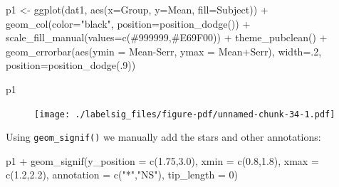 \documentclass[
  letterpaper,
  DIV=11,
  numbers=noendperiod]{scrreprt}
\newenvironment{Shaded}{\begin{snugshade}}{\end{snugshade}}
\newcommand{\AttributeTok}[1]{\textcolor[rgb]{0.40,0.45,0.13}{#1}}
\newcommand{\DecValTok}[1]{\textcolor[rgb]{0.68,0.00,0.00}{#1}}
\newcommand{\FloatTok}[1]{\textcolor[rgb]{0.68,0.00,0.00}{#1}}
\newcommand{\FunctionTok}[1]{\textcolor[rgb]{0.28,0.35,0.67}{#1}}
\newcommand{\NormalTok}[1]{\textcolor[rgb]{0.00,0.23,0.31}{#1}}
\newcommand{\OtherTok}[1]{\textcolor[rgb]{0.00,0.23,0.31}{#1}}
\newcommand{\SpecialCharTok}[1]{\textcolor[rgb]{0.37,0.37,0.37}{#1}}
\newcommand{\StringTok}[1]{\textcolor[rgb]{0.13,0.47,0.30}{#1}}
\begin{document}
\begin{Shaded}
\begin{Highlighting}[]
\NormalTok{p1 }\OtherTok{\textless{}{-}} \FunctionTok{ggplot}\NormalTok{(dat1, }\FunctionTok{aes}\NormalTok{(}\AttributeTok{x=}\NormalTok{Group, }\AttributeTok{y=}\NormalTok{Mean, }\AttributeTok{fill=}\NormalTok{Subject)) }\SpecialCharTok{+} 
  \FunctionTok{geom\_col}\NormalTok{(}\AttributeTok{color=}\StringTok{"black"}\NormalTok{, }\AttributeTok{position=}\FunctionTok{position\_dodge}\NormalTok{()) }\SpecialCharTok{+}
  \FunctionTok{scale\_fill\_manual}\NormalTok{(}\AttributeTok{values=}\FunctionTok{c}\NormalTok{(}\StringTok{\textquotesingle{}\#999999\textquotesingle{}}\NormalTok{,}\StringTok{\textquotesingle{}\#E69F00\textquotesingle{}}\NormalTok{)) }\SpecialCharTok{+}
  \FunctionTok{theme\_pubclean}\NormalTok{() }\SpecialCharTok{+}
  \FunctionTok{geom\_errorbar}\NormalTok{(}\FunctionTok{aes}\NormalTok{(}\AttributeTok{ymin =}\NormalTok{ Mean}\SpecialCharTok{{-}}\NormalTok{Serr, }
                    \AttributeTok{ymax =}\NormalTok{ Mean}\SpecialCharTok{+}\NormalTok{Serr), }
                  \AttributeTok{width=}\NormalTok{.}\DecValTok{2}\NormalTok{,}
                  \AttributeTok{position=}\FunctionTok{position\_dodge}\NormalTok{(.}\DecValTok{9}\NormalTok{)) }

\NormalTok{p1}
\end{Highlighting}
\end{Shaded}

\begin{figure}[H]

{\centering \texttt{[image: ./labelsig\_files/figure-pdf/unnamed-chunk-34-1.pdf]}

}

\end{figure}

Using \texttt{geom\_signif()} we manually add the stars and other
annotations:

\begin{Shaded}
\begin{Highlighting}[]
\NormalTok{p1 }\SpecialCharTok{+} 
  \FunctionTok{geom\_signif}\NormalTok{(}\AttributeTok{y\_position =} \FunctionTok{c}\NormalTok{(}\FloatTok{1.75}\NormalTok{,}\FloatTok{3.0}\NormalTok{), }
              \AttributeTok{xmin =} \FunctionTok{c}\NormalTok{(}\FloatTok{0.8}\NormalTok{,}\FloatTok{1.8}\NormalTok{), }
              \AttributeTok{xmax =} \FunctionTok{c}\NormalTok{(}\FloatTok{1.2}\NormalTok{,}\FloatTok{2.2}\NormalTok{), }
              \AttributeTok{annotation =} \FunctionTok{c}\NormalTok{(}\StringTok{"*"}\NormalTok{,}\StringTok{"NS"}\NormalTok{),}
              \AttributeTok{tip\_length =} \DecValTok{0}\NormalTok{) }
\end{Highlighting}
\end{Shaded}
\end{document}
